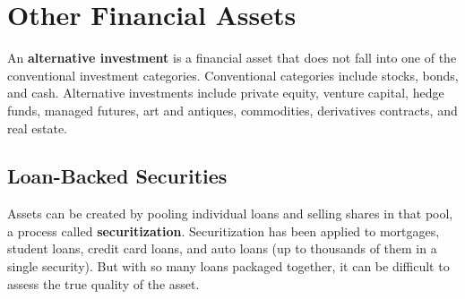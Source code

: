 \documentclass{article}
\begin{document}
\section{Other Financial Assets}

  \begin{definition}
    \label{def:alternative-investment}
    An \textbf{alternative investment} is a financial asset that does not fall into one of the conventional investment categories. Conventional categories include stocks, bonds, and cash. Alternative investments include private equity, venture capital, hedge funds, managed futures, art and antiques, commodities, derivatives contracts, and real estate. 
  \end{definition}

  \subsection{Loan-Backed Securities}

    \begin{definition}[Securitization]
      \label{def:securitization}
      Assets can be created by pooling individual loans and selling shares in that pool, a process called \textbf{securitization}. Securitization has been applied to mortgages, student loans, credit card loans, and auto loans (up to thousands of them in a single security). But with so many loans packaged together, it can be difficult to assess the true quality of the asset. 
    \end{definition}
\end{document}
